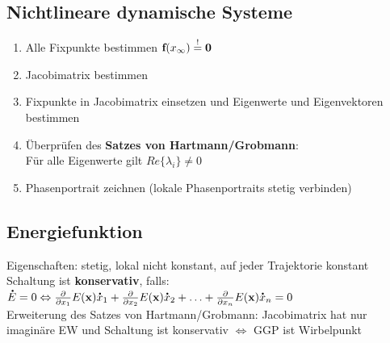 \documentclass[fs, footer]{latex4ei}
\begin{document}
\begin{multicols*}{4}
    \section{Nichtlineare dynamische Systeme}
    \begin{enumerate}
        \item Alle Fixpunkte bestimmen $\textbf{f}(x_\infty) \stackrel{!}{=} \textbf{0}$
        \item Jacobimatrix bestimmen
        \item Fixpunkte in Jacobimatrix einsetzen und Eigenwerte und Eigenvektoren bestimmen
        \item Überprüfen des \textbf{Satzes von Hartmann/Grobmann}: \\Für alle Eigenwerte gilt $Re\{\lambda_i\} \neq 0$
        \item Phasenportrait zeichnen (lokale Phasenportraits stetig verbinden)
    \end{enumerate}
    \subsection{Energiefunktion}
    Eigenschaften: stetig, lokal nicht konstant, auf jeder Trajektorie konstant\\
    Schaltung ist \textbf{konservativ}, falls:\\
    $\accentset{\mbox{\textrm{\large\bfseries .}} }{E} = 0 \Leftrightarrow \frac{\partial}{\partial x_1} E(\textbf{x}) \accentset{\mbox{\textrm{\large\bfseries .}} }{x}_1 + \frac{\partial}{\partial x_2} E(\textbf{x}) \accentset{\mbox{\textrm{\large\bfseries .}} }{x}_2 + \hdots + \frac{\partial}{\partial x_n} E(\textbf{x}) \accentset{\mbox{\textrm{\large\bfseries .}} }{x}_n = 0$\\
    Erweiterung des Satzes von Hartmann/Grobmann: Jacobimatrix hat nur imaginäre EW und Schaltung ist konservativ $\Leftrightarrow$ GGP ist Wirbelpunkt\\

\end{multicols*}
\end{document}

